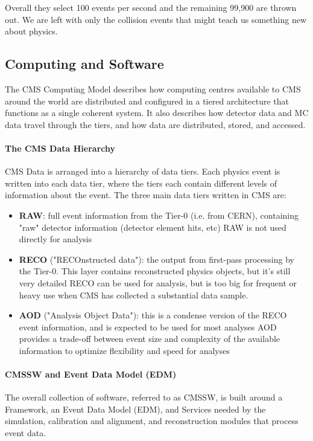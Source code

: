 Overall they select 100 events per second and the remaining 99,900 are thrown out. We are left with only the collision events that might teach us something new about physics. 

\subsection{Computing and Software}

The CMS Computing Model \cite{COMPUTING} describes how computing centres available to CMS around the world are distributed and configured in a tiered architecture that functions as a single coherent system. It also describes how detector data and MC data travel through the tiers, and how data are distributed, stored, and accessed.

\paragraph{The CMS Data Hierarchy}
CMS Data is arranged into a hierarchy of data tiers. Each physics event is written into each data tier, where the tiers each contain different levels of information about the event. The three main data tiers written in CMS are:
\begin{itemize}
\item 
\textbf{RAW}: full event information from the Tier-0 (i.e. from CERN), containing "raw" detector information (detector element hits, etc)
RAW is not used directly for analysis
        
\item   
\textbf{RECO} ("RECOnstructed data"): the output from first-pass processing by the Tier-0. This layer contains reconstructed physics objects, but it's still very detailed RECO can be used for analysis, but is too big for frequent or heavy use when CMS has collected a substantial data sample.

\item   
\textbf{AOD} ("Analysis Object Data"): this is a condense version of the RECO event information, and is expected to be used for most analyses AOD provides a trade-off between event size and complexity of the available information to optimize flexibility and speed for analyses      
\end{itemize} 

     
\paragraph{CMSSW and Event Data Model (EDM)} 
The overall collection of software, referred to as CMSSW, is built around a Framework, an Event Data Model (EDM), and Services needed by the simulation, calibration and alignment, and reconstruction modules that process event data.

